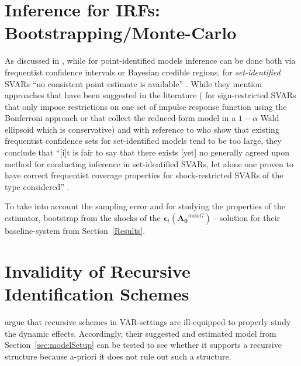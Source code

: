 \documentclass[a4paper,11pt,listof=nochaptergap,oneside,pointednumbers,bibtotoc,bigheadings,liststotoc,hidelinks]{scrbook}
\theoremstyle{mysatz}
\theoremstyle{mydefinition}
\theoremstyle{mytheorem}
\theoremstyle{mybemerkung}
\newcommand{\vect}[1]{\boldsymbol{\mathbf{#1}}}
\begin{document}
\section{Inference for IRFs: Bootstrapping/Monte-Carlo}
\label{sec:EstimatorProperties}
As discussed in \citet{ludvigsonetal:18}, while for point-identified models inference can be done both via frequentist confidence intervals or Bayesian credible regions, for \textit{set-identified} SVARs ``no consistent point estimate is available'' \citep{ludvigsonetal:18}. While they mention approaches that have been suggested in the literature (\citet{granzieraetal:18} for sign-restricted SVARs that only impose restrictions on one set of impulse response function using the Bonferroni approach or \citet{gafarovetal:15} that collect the reduced-form model in a $1-\alpha$ Wald ellipsoid which is conservative) and with reference to \citet{lutkepohlkilian:17} who show that existing frequentist confidence sets for set-identified models tend to be too large, they conclude that ``[i]t is fair to say that there exists [yet] no generally agreed upon method for conducting inference in set-identified SVARs, let alone one proven to have correct frequentist coverage properties for shock-restricted SVARs of the type considered'' \citep[p. 10]{ludvigsonetal:17}.

To take into account the sampling error and for studying the properties of the estimator, \citet{ludvigsonetal:18} bootstrap from the shocks of the $\vect{\epsilon}_t(\vect{A_0}^{maxG})$ - solution for their baseline-system from Section~\ref{Results}. 

\section[Invalidity of Recursive Identification Schemes]{Invalidity of Recursive Identification Schemes}
\label{sec:ValidityRecursiveSchemes}
\citet{ludvigsonetal:18} argue that recursive schemes in VAR-settings are ill-equipped to properly study the dynamic effects. Accordingly, their suggested and estimated model from Section~\ref{sec:modelSetup} can be tested to see whether it supports a recursive structure because a-priori it does not rule out such a structure. 
\end{document}
